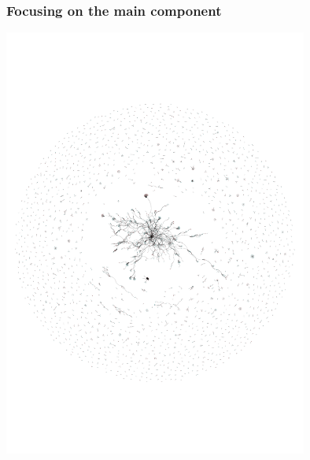 \documentclass[xcolor=dvipsnames, 9pt]{beamer}
\begin{document}
\begin{frame}[fragile]
    \frametitle{Focusing on the main component}
    \includegraphics[width=10cm,clip,trim=2.5cm 7cm 2.5cm 8.5cm]{../images/ssrn_weighted.pdf}
\end{frame}
\end{document}

